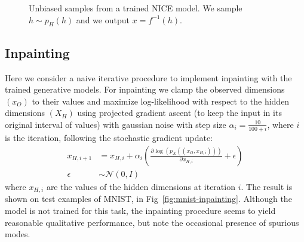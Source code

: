 \documentclass{article}
\def\N{{\mathcal{N}}}
\begin{document}
\begin{figure}
    \centering {}
    \caption{Unbiased samples from a trained NICE model. We sample
        $h \sim p_{H}(h)$ and we output $x = f^{-1}(h)$.}
    \label{fig:samples}
\end{figure}

\subsection{Inpainting}
Here we consider a naive iterative procedure to implement inpainting with
the trained generative models. For inpainting we clamp the observed dimensions $(x_O)$ to
their values and maximize log-likelihood with respect to the hidden
dimensions $(X_H)$ using projected gradient ascent (to keep the input in its
original interval of values) with gaussian noise with step size
$\alpha_{i} = \frac{10}{100+i}$, where $i$ is the iteration, following the 
stochastic gradient update:
\begin{align*}
x_{H,i+1} &= x_{H,i} + \alpha_{i}(\frac{\partial \log(p_X((x_{O},x_{H,i})))}{\partial x_{H,i}} + \epsilon)\\
\epsilon &\sim \N(0, I) \end{align*}
where $x_{H,i}$ are the values of the hidden dimensions at iteration $i$.
The result is shown on test examples of MNIST, in Fig~\ref{fig:mnist-inpainting}.
Although the model is not trained for this
task, the inpainting procedure seems to yield reasonable qualitative
performance, but note the occasional presence of spurious modes.
\end{document}
